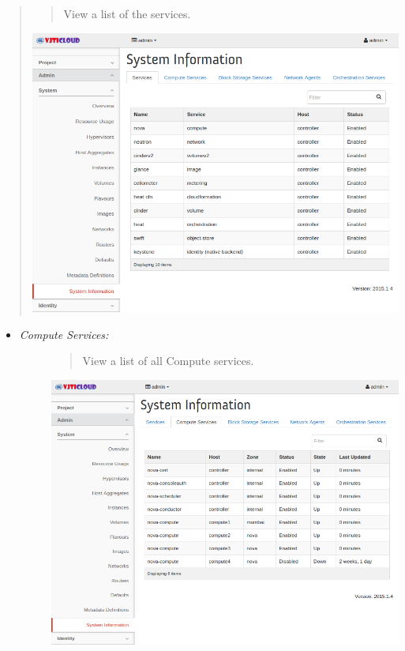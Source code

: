 \documentclass[letterpaper,10pt,english]{sphinxmanual}
\begin{document}
\begin{description}
\begin{quote}
\begin{quote}
View a list of the services.
\end{quote}

\includegraphics{sys_services.png}
\end{quote}
\begin{itemize}
\item {} \begin{description}
\item[{\emph{Compute Services:}}] \leavevmode\begin{quote}

View a list of all Compute services.
\end{quote}

\includegraphics{sys_compute_services.png}


\end{description}
\end{itemize}
\end{description}
\end{document}

